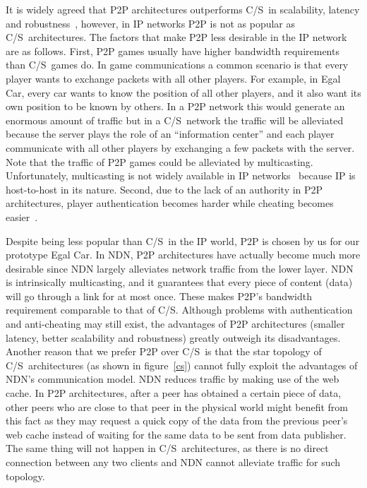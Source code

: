 \documentclass{article}
\newcommand{\cs}{C\slash S}
\begin{document}
It is widely agreed that P2P architectures outperforms \cs~in scalability, latency and robustness~\cite{Fgame, Scheating}, however, in IP networks P2P is not as popular as \cs~architectures. The factors that make P2P less desirable in the IP network are as follows. First, P2P games usually have higher bandwidth requirements than \cs~games do. In game communications a common scenario is that every player wants to exchange packets with all other players. For example, in Egal Car, every car wants to know the position of all other players, and it also want its own position to be known by others. In a P2P network this would generate an enormous amount of traffic but in a \cs~network the traffic will be alleviated because the server plays the role of an ``information center'' and each player communicate with all other players by exchanging a few packets with the server. Note that the traffic of P2P games could be alleviated by multicasting. Unfortunately, multicasting is not widely available in IP networks~\cite{Fgame} because IP is host-to-host in its nature. Second, due to the lack of an authority in P2P architectures, player authentication becomes harder while cheating becomes easier~\cite{Scheating}.

Despite being less popular than \cs~in the IP world, P2P is chosen by us for our prototype Egal Car. In NDN, P2P architectures have actually become much more desirable since NDN largely alleviates network traffic from the lower layer. NDN is intrinsically multicasting, and it guarantees that every piece of content (data) will go through a link for at most once. These makes P2P's bandwidth requirement comparable to that of \cs. Although problems with authentication and anti-cheating may still exist, the advantages of P2P architectures (smaller latency, better scalability and robustness) greatly outweigh its disadvantages. Another reason that we prefer P2P over \cs~is that the star topology of \cs~architectures (as shown in figure~\ref{cs}) cannot fully exploit the advantages of NDN's communication model. NDN reduces traffic by making use of the web cache. In P2P architectures, after a peer has obtained a certain piece of data, other peers who are close to that peer in the physical world might benefit from this fact as they may request a quick copy of the data from the previous peer's web cache instead of waiting for the same data to be sent from data publisher. The same thing will not happen in \cs~architectures, as there is no direct connection between any two clients and NDN cannot alleviate traffic for such topology.
\end{document}
